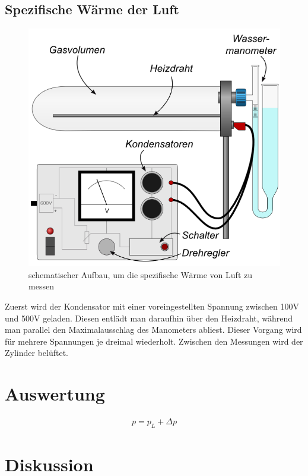 \documentclass[12pt,a4paper,titlepage,headinclude,bibtotoc]{scrartcl}
\begin{document}
\subsection{Spezifische Wärme der Luft}
\begin{figure}[!htb]
 \centering
 \includegraphics[scale=0.7]{SpezWaermeSkizze.jpg}
 \caption{schematischer Aufbau, um die spezifische Wärme von Luft zu messen \cite{lp}}
 \label{fig:SWLSkizze}
\end{figure}
Zuerst wird der Kondensator mit einer voreingestellten Spannung zwischen 100V und 500V geladen.
Diesen entlädt man daraufhin über den Heizdraht, während man parallel den Maximalausschlag des Manometers abliest.
Dieser Vorgang wird für mehrere Spannungen je dreimal wiederholt.
Zwischen den Messungen wird der Zylinder belüftet.

\section{Auswertung}
\label{sec:auswertung}
\begin{align}
	p=p_L+\Delta p
\end{align}

\section{Diskussion}
\label{sec:diskussion}
\end{document}
